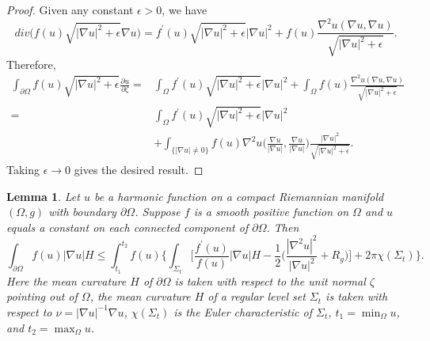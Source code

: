 \documentclass[12pt]{article}
\theoremstyle{definition}
\theoremstyle{plain}
\newtheorem{lemma}{Lemma}[section]
\numberwithin{equation}{section}
\begin{document}
\begin{proof}
Given any constant $ \epsilon>0 $, we have
$$
div\Big(f(u)\sqrt{|\nabla u|^{2}+\epsilon}\nabla u\Big)
=f^{\prime}(u)\sqrt{|\nabla u|^{2}+\epsilon}|\nabla u|^{2}+f(u)\frac{\nabla^{2}u(\nabla u,\nabla u)}{\sqrt{|\nabla u|^{2}+\epsilon}}.
$$
Therefore,
$$
\begin{aligned}
\int_{\partial \Omega}f(u)\sqrt{|\nabla u|^{2}+\epsilon}\frac{\partial u}{\partial \zeta}=&\int_{\Omega}f^{\prime}(u)\sqrt{|\nabla u|^{2}+\epsilon}|\nabla u|^{2}+\int_{\Omega}f(u)\frac{\nabla^{2}u(\nabla u,\nabla u)}{\sqrt{|\nabla u|^{2}+\epsilon}}\\
=&\int_{\Omega}f^{\prime}(u)\sqrt{|\nabla u|^{2}+\epsilon}|\nabla u|^{2}\\
&+\int_{\{|\nabla u|\neq 0\}}f(u)\nabla^{2}u\Big(\frac{\nabla u}{|\nabla u|},\frac{\nabla u}{|\nabla u|}\Big)\frac{|\nabla u|^{2}}{\sqrt{|\nabla u|^{2}+\epsilon}}.
\end{aligned}
$$
Taking $ \epsilon\to 0 $ gives the desired result.
\end{proof}
\begin{lemma}\label{f(u)2}
Let $ u $ be a harmonic function on a compact Riemannian manifold $ (\Omega,g) $ with boundary $ \partial \Omega $. Suppose $ f $ is a smooth positive function on $ \Omega $ and $ u $ equals a constant on each connected component of $ \partial \Omega $. Then
\begin{equation}\label{key}
\int_{\partial \Omega}f(u)|\nabla u|H\leq \int_{t_{1}}^{t_{2}}f(u) \Big\{\int_{\Sigma_{t}}\Big[\frac{f^{\prime}(u)}{f(u)}|\nabla u|H-\frac{1}{2}\Big(\frac{|\nabla^{2}u|^{2}}{|\nabla u|^{2}}+R_{g}\Big)\Big]+2\pi \chi(\Sigma_{t}) \Big\}.
\end{equation} 
Here the mean curvature $ H $ of $ \partial \Omega $ is taken with respect to the unit normal $ \zeta $ pointing out of $ \Omega $, the mean curvature $ H $ of a regular level set $ \Sigma_{t} $ is taken with respect to $ \nu=|\nabla u|^{-1}\nabla u $, $ \chi (\Sigma_{t}) $ is the Euler characteristic of $ \Sigma_{t} $, $ t_{1}=\min_{\Omega} u $, and $ t_{2}=\max_{\Omega} u $.
\end{lemma}
\end{document}
